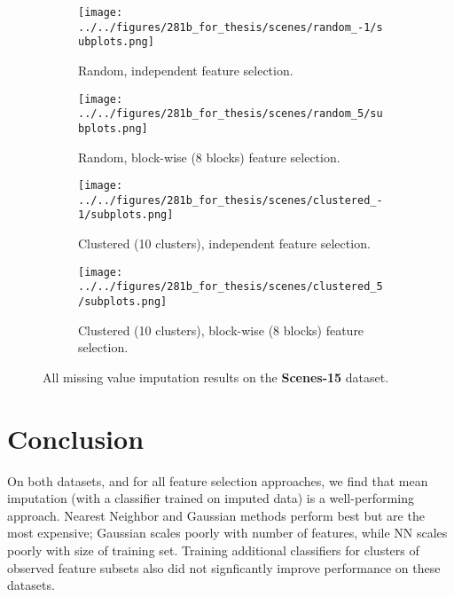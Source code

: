 \begin{figure}[ht]
    \centering
    \begin{subfigure}[b]{.8\textwidth}
        \centering
        \texttt{[image: ../../figures/281b\_for\_thesis/scenes/random\_-1/subplots.png]}
        \caption{Random, independent feature selection.\vspace{.2cm}}
    \end{subfigure}
    \begin{subfigure}[b]{.8\textwidth}
        \centering
        \texttt{[image: ../../figures/281b\_for\_thesis/scenes/random\_5/subplots.png]}
        \caption{Random, block-wise (8 blocks) feature selection.\vspace{.2cm}}
    \end{subfigure}
    \begin{subfigure}[b]{\textwidth}
        \centering
        \texttt{[image: ../../figures/281b\_for\_thesis/scenes/clustered\_-1/subplots.png]}
        \caption{Clustered (10 clusters), independent feature selection.\vspace{.2cm}}
    \end{subfigure}
    \begin{subfigure}[b]{\textwidth}
        \centering
        \texttt{[image: ../../figures/281b\_for\_thesis/scenes/clustered\_5/subplots.png]}
        \caption{Clustered (10 clusters), block-wise (8 blocks) feature selection.\vspace{.2cm}}
    \end{subfigure}
    \caption{All missing value imputation results on the \textbf{Scenes-15} dataset.}
    \label{fig:scenes}
\end{figure}

\section{Conclusion}

On both datasets, and for all feature selection approaches, we find that mean imputation (with a classifier trained on imputed data) is a well-performing approach.
Nearest Neighbor and Gaussian methods perform best but are the most expensive; Gaussian scales poorly with number of features, while NN scales poorly with size of training set.
Training additional classifiers for clusters of observed feature subsets also did not signficantly improve performance on these datasets.
